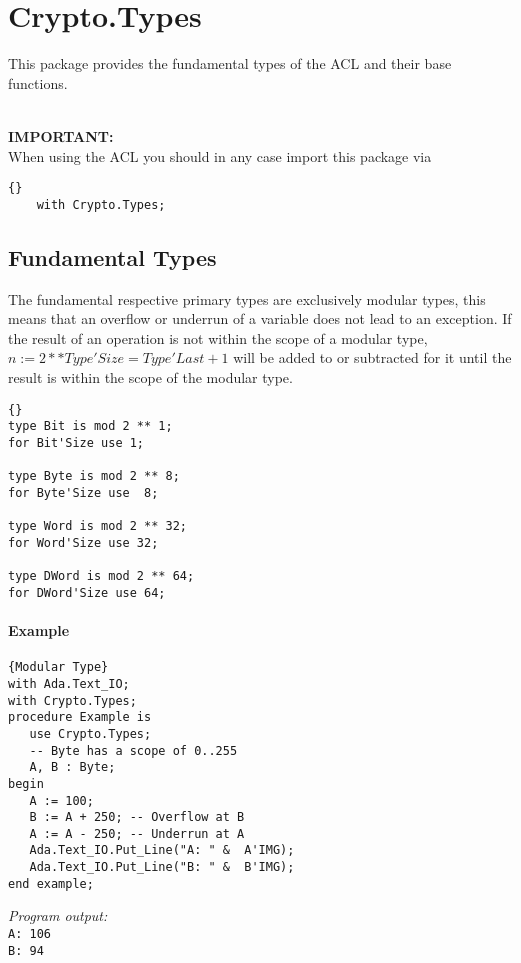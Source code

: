 \chapter{Crypto.Types}

This package provides the fundamental types of the ACL and their base 
functions.\\ 
\ \\
{\large \textbf{IMPORTANT:} \\
  When using the ACL you should in any case import this package via
  \begin{lstlisting}{}
    with Crypto.Types;
  \end{lstlisting}
  }


\section{Fundamental Types}
The fundamental respective primary types are exclusively modular types,
this means that an overflow or underrun of a variable does not lead to an
exception. If the result of an operation is not within the scope of a modular
type, $n:=2**Type'Size=Type'Last+1$ will be added to or subtracted for it
until the result is within the scope of the modular type. \\

\begin{lstlisting}{}
type Bit is mod 2 ** 1;
for Bit'Size use 1;

type Byte is mod 2 ** 8;
for Byte'Size use  8;

type Word is mod 2 ** 32;
for Word'Size use 32;

type DWord is mod 2 ** 64;
for DWord'Size use 64;
\end{lstlisting}



\subsubsection{Example}
\begin{lstlisting}[frame=brtl]{Modular Type}
with Ada.Text_IO;
with Crypto.Types;
procedure Example is
   use Crypto.Types;
   -- Byte has a scope of 0..255
   A, B : Byte;
begin
   A := 100;
   B := A + 250; -- Overflow at B
   A := A - 250; -- Underrun at A
   Ada.Text_IO.Put_Line("A: " &  A'IMG);
   Ada.Text_IO.Put_Line("B: " &  B'IMG);
end example;
\end{lstlisting}
\textit{Program output:\\}
\texttt{A:  106\\B:  94}

